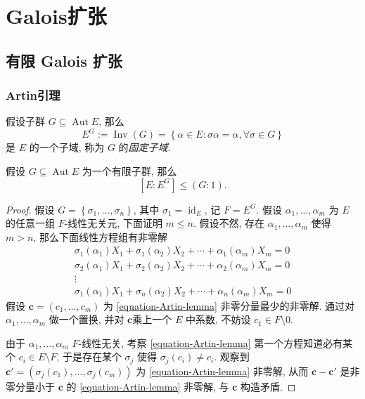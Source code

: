 ﻿\chapter{Galois扩张}

\section{有限 Galois 扩张}

\subsection{Artin引理}

假设子群 \( G \subseteq \operatorname{Aut} E \), 那么
\[
  E^G := \operatorname{Inv}(G) = \left\lbrace \alpha \in E: \sigma \alpha =
  \alpha, \forall \sigma \in G \right\rbrace
\]
是 \( E \) 的一个子域, 称为 \( G \) 的\emph{固定子域}.

\begin{lemma}[Artin]
  \label{lemma-Artin}
  假设 \( G \subseteq \operatorname{Aut} E \) 为一个有限子群, 那么
  \[
    [E: E^G] \leq (G: 1).
  \]
\end{lemma}
\begin{proof}
  假设 \( G = \left\lbrace \sigma_1, \ldots, \sigma_n \right\rbrace \), 其中 \(
  \sigma_1 = \operatorname{id}_E \), 记 \( F = E^G \).
  假设 \( \alpha_1, \ldots, \alpha_m \) 为 \( E \) 的任意一组 \( F
  \)-线性无关元, 下面证明 \( m \leq n \).
  假设不然, 存在 \( \alpha_1, \ldots, \alpha_m \) 使得 \( m > n \),
  那么下面线性方程组有非零解
  \begin{equation}
    \begin{gathered}
      \sigma_1(\alpha_1)X_1 + \sigma_1(\alpha_2) X_2 + \cdots + \alpha_1
      (\alpha_m) X_m = 0\\
      \sigma_2(\alpha_1)X_1 + \sigma_2(\alpha_2) X_2 + \cdots + \alpha_2
      (\alpha_m) X_m = 0\\
      \vdots\\
      \sigma_1(\alpha_1)X_1 + \sigma_n(\alpha_2) X_2 + \cdots + \alpha_n
      (\alpha_m) X_m = 0
    \end{gathered}
    \label{equation-Artin-lemma}
  \end{equation}
  假设 \( \mathbf{c} = (c_1, \ldots, c_m) \) 为 \eqref{equation-Artin-lemma}
  非零分量最少的非零解.
  通过对 \( \alpha_1, \ldots, \alpha_m \) 做一个置换, 并对 \( \mathbf{c}
  \)乘上一个 \( E \) 中系数, 不妨设 \( c_1 \in F \setminus 0\).

  由于 \( \alpha_1, \ldots, \alpha_m \) \( F \)-线性无关, 考察
  \eqref{equation-Artin-lemma} 第一个方程知道必有某个 \( c_i \in E \setminus F
  \), 于是存在某个 \( \sigma_j \) 使得 \( \sigma_j(c_i) \neq c_i \).
  观察到 \( \mathbf{c}' =  (\sigma_j(c_1),\ldots, \sigma_j(c_m)) \) 为
  \eqref{equation-Artin-lemma} 非零解, 从而 \( \mathbf{c} - \mathbf{c}' \)
  是非零分量小于 \( \mathbf{c} \) 的 \eqref{equation-Artin-lemma} 非零解, 与 \(
  \mathbf{c} \) 构造矛盾.
\end{proof}

